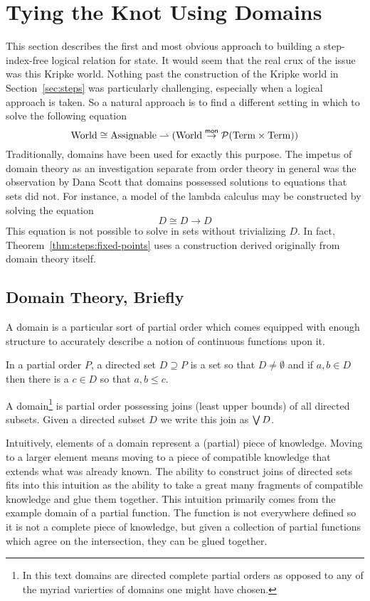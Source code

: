\section{Tying the Knot Using Domains}\label{sec:domains}

This section describes the first and most obvious approach to building
a step-index-free logical relation for state. It would seem that the
real crux of the issue was this Kripke world. Nothing past the
construction of the Kripke world in Section~\ref{sec:steps}
was particularly challenging, especially when a logical approach is
taken. So a natural approach is to find a different setting in which
to solve the following equation
\[
  \mathrm{World} \cong \mathrm{Assignable} \rightharpoonup (\mathrm{World} \overset{\mathsf{mon}}{\to} \mathcal{P}(\mathrm{Term} \times \mathrm{Term}))
\]
Traditionally, domains have been used for exactly this purpose. The
impetus of domain theory as an investigation separate from order
theory in general was the observation by Dana Scott that domains
possessed solutions to equations that sets did not. For instance, a
model of the lambda calculus may be constructed by solving the
equation
\[
  D \cong D \to D
\]
This equation is not possible to solve in sets without trivializing
$D$. In fact, Theorem~\ref{thm:steps:fixed-points} uses a construction
derived originally from domain theory itself.

\subsection{Domain Theory, Briefly}

A domain is a particular sort of partial order which comes equipped
with enough structure to accurately describe a notion of continuous
functions upon it.
\begin{defn}\label{def:domains:directed-set}
  In a partial order $P$, a directed set $D \supseteq P$ is a set so
  that $D \neq \emptyset$ and if $a, b \in D$ then there is a $c \in
  D$ so that $a, b \le c$.
\end{defn}
\begin{defn}\label{def:domains:domain}
  A domain\footnote{In this text domains are directed complete partial
    orders as opposed to any of the myriad varierties of domains one
    might have chosen.} is partial order possessing joins (least upper
  bounds) of all directed subsets. Given a directed subset $D$ we
  write this join as $\bigvee D$.
\end{defn}
Intuitively, elements of a domain represent a (partial) piece of
knowledge. Moving to a larger element means moving to a piece of
compatible knowledge that extends what was already known. The ability
to construct joins of directed sets fits into this intuition as the
ability to take a great many fragments of compatible knowledge and
glue them together. This intuition primarily comes from the example
domain of a partial function. The function is not everywhere defined
so it is not a complete piece of knowledge, but given a collection of
partial functions which agree on the intersection, they can be glued
together.

